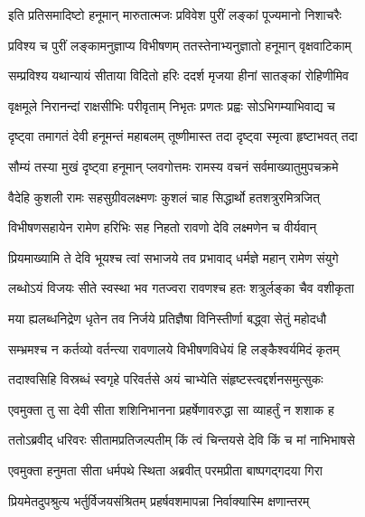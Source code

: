 
\twolineshloka
{इति प्रतिसमादिष्टो हनूमान् मारुतात्मजः}
{प्रविवेश पुरीं लङ्कां पूज्यमानो निशाचरैः} %

\twolineshloka
{प्रविश्य च पुरीं लङ्कामनुज्ञाप्य विभीषणम्}
{ततस्तेनाभ्यनुज्ञातो हनूमान् वृक्षवाटिकाम्} %

\twolineshloka
{सम्प्रविश्य यथान्यायं सीताया विदितो हरिः}
{ददर्श मृजया हीनां सातङ्कां रोहिणीमिव} %

\twolineshloka
{वृक्षमूले निरानन्दां राक्षसीभिः परीवृताम्}
{निभृतः प्रणतः प्रह्वः सोऽभिगम्याभिवाद्य च} %

\twolineshloka
{दृष्ट्वा तमागतं देवी हनूमन्तं महाबलम्}
{तूष्णीमास्त तदा दृष्ट्वा स्मृत्वा हृष्टाभवत् तदा} %

\twolineshloka
{सौम्यं तस्या मुखं दृष्ट्वा हनूमान् प्लवगोत्तमः}
{रामस्य वचनं सर्वमाख्यातुमुपचक्रमे} %

\twolineshloka
{वैदेहि कुशली रामः सहसुग्रीवलक्ष्मणः}
{कुशलं चाह सिद्धार्थो हतशत्रुरमित्रजित्} %

\twolineshloka
{विभीषणसहायेन रामेण हरिभिः सह}
{निहतो रावणो देवि लक्ष्मणेन च वीर्यवान्} %

\twolineshloka
{प्रियमाख्यामि ते देवि भूयश्च त्वां सभाजये}
{तव प्रभावाद् धर्मज्ञे महान् रामेण संयुगे} %

\twolineshloka
{लब्धोऽयं विजयः सीते स्वस्था भव गतज्वरा}
{रावणश्च हतः शत्रुर्लङ्का चैव वशीकृता} %

\twolineshloka
{मया ह्यलब्धनिद्रेण धृतेन तव निर्जये}
{प्रतिज्ञैषा विनिस्तीर्णा बद्ध्वा सेतुं महोदधौ} %

\twolineshloka
{सम्भ्रमश्च न कर्तव्यो वर्तन्त्या रावणालये}
{विभीषणविधेयं हि लङ्कैश्वर्यमिदं कृतम्} %

\twolineshloka
{तदाश्वसिहि विस्रब्धं स्वगृहे परिवर्तसे}
{अयं चाभ्येति संहृष्टस्त्वद्दर्शनसमुत्सुकः} %

\twolineshloka
{एवमुक्ता तु सा देवी सीता शशिनिभानना}
{प्रहर्षेणावरुद्धा सा व्याहर्तुं न शशाक ह} %

\twolineshloka
{ततोऽब्रवीद् धरिवरः सीतामप्रतिजल्पतीम्}
{किं त्वं चिन्तयसे देवि किं च मां नाभिभाषसे} %

\twolineshloka
{एवमुक्ता हनुमता सीता धर्मपथे स्थिता}
{अब्रवीत् परमप्रीता बाष्पगद्गदया गिरा} %

\twolineshloka
{प्रियमेतदुपश्रुत्य भर्तुर्विजयसंश्रितम्}
{प्रहर्षवशमापन्ना निर्वाक्यास्मि क्षणान्तरम्} %

